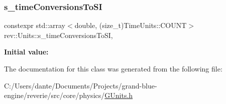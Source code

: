 \subsubsection{\texorpdfstring{s\_timeConversionsToSI}{s\_timeConversionsToSI}}
{\footnotesize\ttfamily constexpr std\+::array$<$double, (size\+\_\+t)Time\+Units\+::\+C\+O\+U\+NT$>$ rev\+::\+Units\+::s\+\_\+time\+Conversions\+To\+SI\hspace{0.3cm}{\ttfamily [static]}, {\ttfamily [protected]}}

{\bfseries Initial value\+:}
\begin{DoxyCode}{0}
\DoxyCodeLine{\{}
\DoxyCodeLine{    \}}

\end{DoxyCode}


The documentation for this class was generated from the following file\+:\begin{DoxyCompactItemize}
\item 
C\+:/\+Users/dante/\+Documents/\+Projects/grand-\/blue-\/engine/reverie/src/core/physics/\mbox{\hyperlink{_g_units_8h}{G\+Units.\+h}}\end{DoxyCompactItemize}
